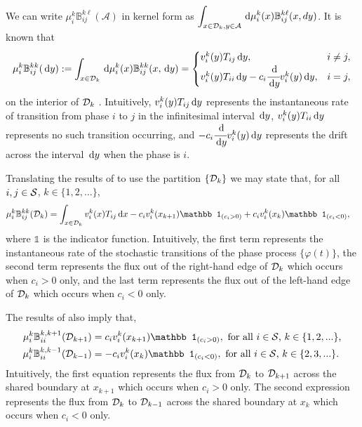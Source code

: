 We can write \(\mu_i^k\mathbb B_{ij}^{k\ell}(\mathcal A)\) in kernel form as \(\displaystyle\int_{x\in\mathcal{D}_k,y\in\mathcal A}\, \mathrm{d} \mu_i^k(x)\mathbb B_{ij}^{k\ell}(x,dy)\). It is known that
\[\mu_i^k\mathbb B_{ij}^{kk}(\, \mathrm{d} y):=\int_{x\in\mathcal{D}_k}\, \mathrm{d}\mu_i^k(x)\mathbb B_{ij}^{kk}(x,\, \mathrm{d} y)=\begin{cases}
v_i^k(y)T_{ij}\, \mathrm{d} y, & i\neq j,\\
v_i^k(y)T_{ii}\, \mathrm{d} y - c_i\cfrac{\, \mathrm{d}}{\, \mathrm{d} y}v_i^k(y)\, \mathrm{d} y, & i=j, 
\end{cases}\]
on the interior of \(\mathcal{D}_k\) \citep{kk1995}. Intuitively, \(v_i^k(y)T_{ij}\, \mathrm{d} y\) represents the instantaneous rate of transition from phase \(i\) to \(j\) in the infinitesimal interval \(\, \mathrm{d} y\), \(v_i^k(y)T_{ii}\, \mathrm{d} y\) represents no such transition occurring, and \(- c_i\cfrac{\, \mathrm{d}}{\, \mathrm{d} y}v_i^k(y)\, \mathrm{d} y\) represents the drift across the interval \(\, \mathrm{d} y\) when the phase is \(i\). 

Translating the results of \cite{bo2014} to use the partition \(\{\mathcal{D}_k\}\) we may state that, for all \(i,j\in\mathcal{S}\), \(k\in\{1,2,\dots\}\),
\begin{align*}
\mu_i^{k}\mathbb B_{ij}^{kk}(\calD_k)&=\int_{x\in\calD_k}v_i^k(x)T_{ij}\wrt x - c_iv_i^{k}(x_{k+1})\mathbb 1_{(c_i>0)} + c_iv_i^{k}(x_{k})\mathbb 1_{(c_i<0)},
\end{align*}
where \(\mathbb 1_{}\) is the indicator function. 
Intuitively, the first term represents the instantaneous rate of the stochastic transitions of the phase process \(\{\varphi(t)\}\), the second term represents the flux out of the right-hand edge of \(\mathcal{D}_k\) which occurs when \(c_i>0\) only, and the last term represents the flux out of the left-hand edge of \(\mathcal{D}_k\) which occurs when \(c_i<0\) only. 

The results of \cite{bo2014} also imply that, 
\begin{align*}
\mu_i^{k}\mathbb B_{ii}^{k,k+1}(\calD_{k+1})&= c_iv_i^{k}(x_{k+1})\mathbb 1_{(c_i>0)},\mbox{ for all \(i\in\calS\), \(k\in\{1,2,...\}\),}
\\\mu_i^{k}\mathbb B_{ii}^{k,k-1}(\calD_{k-1})&= -c_iv_i^{k}(x_{k})\mathbb 1_{(c_i<0)}, \mbox{  for all \(i\in\calS\), \(k\in\{2,3,...\}\)}.
\end{align*}
Intuitively, the first equation represents the flux from \(\mathcal{D}_k\) to \(\mathcal{D}_{k+1}\) across the shared boundary at \(x_{k+1}\) which occurs when \(c_i>0\) only. The second expression represents the flux from \(\mathcal{D}_k\) to \(\mathcal{D}_{k-1}\) across the shared boundary at \(x_{k}\) which occurs when \(c_i<0\) only. 

